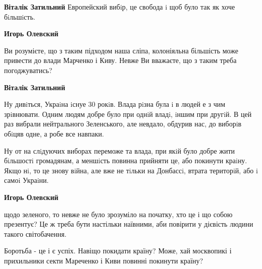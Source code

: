 \begin{itemize}
\begin{itemize}
\begin{itemize}
\textbf{Віталік Затильний}
Европейский вибiр, це свобода i щоб було так як хоче бiльшiсть.

 
\textbf{Игорь Олевский} 

Ви розумієте, що з таким підходом наша сліпа, колоніяльна більшість може
привести до влади Марченко і Киву. Невже Ви вважаєте, що з таким треба
погоджуватись?

 
\textbf{Віталік Затильний}

Ну дивiться, Украiна iснуе 30 рокiв. Влада рiзна була i в людей е з чим
зрiвнювати. Одним людям добре було при однiй владi, iншим при другiй. В цей раз
вибрали нейтрального Зеленського, але невдало, обдурив нас, до виборiв обiцяв
одне, а робе все навпаки.

Ну от на слiдуючих виборах переможе та влада, при якiй було добре жити
бiльшостi громадянам, а меншiсть повинна прийняти це, або покинути краiну. Якщо
нi, то це знову вiйна, але вже не тiльки на Донбассi, втрата територiй, або i
самоi Украiни.

 
\textbf{Игорь Олевский} 

щодо зеленого, то невже не було зрозуміло на початку, хто це і що собою
презентує? Це ж треба бути настільки наївними, аби повірити у дієвість людини
такого світобачення.

Боротьба - це і є успіх. Навіщо покидати країну? Може, хай москвопикі і
прихильники секти Мареченко і Киви повинні покинути країну?

 

\end{itemize}
\end{itemize}
\end{itemize}
